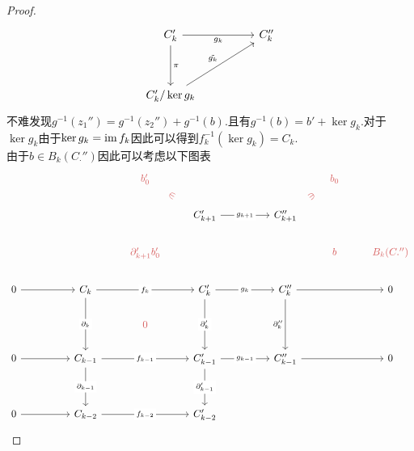 \documentclass{article}
\begin{document}
\begin{definition}
\begin{proof}
    \[\begin{tikzcd}
        {C_k'} && {C_k''} \\
        \\
        {C_k'/\ker g_k}
        \arrow["\pi", from=1-1, to=3-1]
        \arrow["{g_k}"', from=1-1, to=1-3]
        \arrow["{\tilde{g_k}}", from=3-1, to=1-3]
    \end{tikzcd}\]
    不难发现$g^{-1}(z_1'') = g^{-1}(z_2'')+g^{-1}(b)$.且有$g^{-1}(b) = b'+\ker g_k$.对于$\ker g_k$由于$\ker g_k = \operatorname{im} f_k$因此可以得到$f^{-1}_k (\ker g_k) = C_k$.\\
    由于$b \in B_k(C_\cdot'')$因此可以考虑以下图表
    \[\begin{tikzcd}
        &&& \textcolor{rgb,255:red,214;green,92;blue,92}{b'_0} &&&& \textcolor{rgb,255:red,214;green,92;blue,92}{b_0} \\
        &&&& {C_{k+1}'} && {C_{k+1}''} \\
        &&& \textcolor{rgb,255:red,214;green,92;blue,92}{\partial_{k+1}'b_0'} &&&& \textcolor{rgb,255:red,214;green,92;blue,92}{b} & \textcolor{rgb,255:red,214;green,92;blue,92}{B_k(C.'')} \\
        0 && {C_{k}} && {C_k'} && {C_k''} && 0 \\
        &&& \textcolor{rgb,255:red,214;green,92;blue,92}{0} \\
        0 && {C_{k-1}} && {C_{k-1}'} && {C_{k-1}''} && 0 \\
        \\
        0 && {C_{k-2}} && {C_{k-2}'}
        \arrow[from=4-1, to=4-3]
        \arrow["{f_k}"{description}, from=4-3, to=4-5]
        \arrow["{g_k}"{description}, from=4-5, to=4-7]
        \arrow[from=4-7, to=4-9]
        \arrow["{\partial_{k}}"{description}, from=4-3, to=6-3]
        \arrow[from=6-1, to=6-3]
        \arrow["{f_{k-1}}"{description}, from=6-3, to=6-5]
        \arrow["{\partial'_{k}}"{description}, from=4-5, to=6-5]
        \arrow["{g_{k-1}}"{description}, from=6-5, to=6-7]
        \arrow["{\partial''_{k}}"', from=4-7, to=6-7]
        \arrow[from=6-7, to=6-9]
        \arrow["{\partial_{k-1}}"{description}, from=6-3, to=8-3]
        \arrow[from=8-1, to=8-3]
        \arrow["{\partial'_{k-1}}"{description}, from=6-5, to=8-5]
        \arrow["{f_{k-2}}"{description}, from=8-3, to=8-5]
        \arrow["\in"{marking}, color={rgb,255:red,214;green,92;blue,92}, draw=none, from=1-4, to=2-5]
        \arrow["\ni"{marking}, color={rgb,255:red,214;green,92;blue,92}, draw=none, from=1-8, to=2-7]
        \arrow["{g_{k+1}}"{description}, from=2-5, to=2-7]

\end{tikzcd}\]
\end{proof}
\end{definition}
\end{document}
